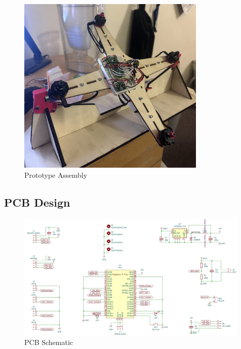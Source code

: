 \documentclass{article}
\begin{document}
\begin{figure}[H]
    \centering
    \includegraphics[width=0.8\textwidth]{development.jpg}
    \caption{Prototype Assembly}
\end{figure}

\subsection{PCB Design}

\begin{figure}[H]
    \centering
    \includegraphics[width=0.99\textwidth]{schematic.jpg}
    \caption{PCB Schematic}
\end{figure}
\end{document}
